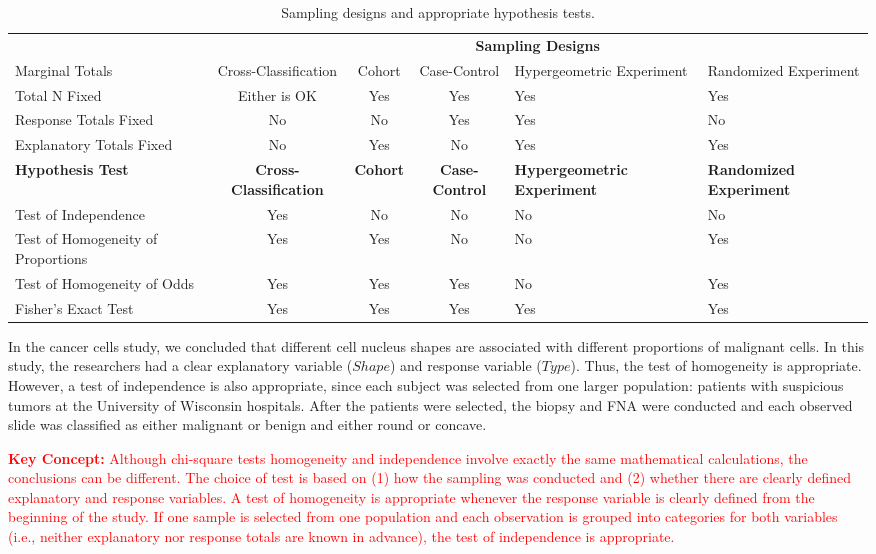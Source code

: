 \documentclass[
]{report}
\begin{document}
\begin{table}[!h]
\centering
\caption{\label{tab:tab6} Sampling designs and appropriate hypothesis tests.}
\centering
\begin{tabular}[t]{>{\raggedright\arraybackslash}p{2cm}ccc>{\centering\arraybackslash}p{3cm}>{\centering\arraybackslash}p{2.5cm}}
\toprule
\multicolumn{1}{c}{\textbf{ }} & \multicolumn{5}{c}{\textbf{Sampling Designs}} \\
\cmidrule(l{3pt}r{3pt}){2-6}
Marginal Totals & Cross-Classification & Cohort & Case-Control & Hypergeometric Experiment & Randomized Experiment\\
\midrule
Total N Fixed & Either is OK & Yes & Yes & Yes & Yes\\
Response Totals Fixed & No & No & Yes & Yes & No\\
Explanatory Totals Fixed & No & Yes & No & Yes & Yes\\
\textbf{Hypothesis Test} & \textbf{Cross-Classification} & \textbf{Cohort} & \textbf{Case-Control} & \textbf{Hypergeometric Experiment} & \textbf{Randomized Experiment}\\
Test of Independence & Yes & No & No & No & No\\
\addlinespace
Test of Homogeneity of Proportions & Yes & Yes & No & No & Yes\\
Test of Homogeneity of Odds & Yes & Yes & Yes & No & Yes\\
Fisher's Exact Test & Yes & Yes & Yes & Yes & Yes\\
\bottomrule
\end{tabular}
\end{table}

In the cancer cells study, we concluded that different cell nucleus shapes are associated with different
proportions of malignant cells. In this study, the researchers had a clear explanatory variable (\(Shape\)) and
response variable (\(Type\)). Thus, the test of homogeneity is appropriate. However, a test of independence is
also appropriate, since each subject was selected from one larger population: patients with suspicious tumors
at the University of Wisconsin hospitals. After the patients were selected, the biopsy and FNA were conducted
and each observed slide was classified as either malignant or benign and either round or concave.

\Large

\textbf{\textcolor{red}{Key Concept:}}
\textcolor{red}{Although chi-square tests homogeneity and independence involve exactly the same mathematical calculations, the conclusions can be different. The choice of test is based on (1) how the sampling was conducted and (2) whether there are clearly defined explanatory and response variables. A test of homogeneity is appropriate whenever the response variable is clearly defined from the beginning of the study. If one sample is selected from one population and each observation is grouped into categories for both variables (i.e., neither explanatory nor response totals are known in advance), the test of independence is appropriate.}
\normalsize
\end{document}
